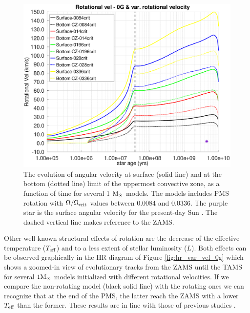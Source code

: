 \documentclass[fleqn,usenatbib]{mnras}
\begin{document}
\begin{figure}
	\includegraphics[trim = 10mm 10mm 15mm 10mm clip,width=\columnwidth]{figures/rot_vel_var_vel_0_0g.eps}
    \caption{The evolution of angular velocity at surface (solid line) and at the bottom (dotted line) limit of the uppermost convective zone, as a function of time for several 1 $\mathrm{M}_\odot$ models. The models includes PMS rotation with $\Omega / \Omega_{\mathrm{crit}}$ values between 0.0084 and 0.0336. The purple star is the surface angular velocity for the present-day Sun \citep{Gill2012}. The dashed vertical line makes reference to the ZAMS.}
    \label{fig:rot_vel_0g}
\end{figure}

Other well-known structural effects of rotation are the decrease of the effective temperature ($T_{\mathrm{eff}}$) and to a less extent of stellar luminosity ($L$). Both effects can be observed graphically in the HR diagram of Figure \ref{fig:hr_var_vel_0g} which shows a zoomed-in view of evolutionary tracks from the ZAMS until the TAMS for several $1\mathrm{M}_\odot$ models initialized with different rotational velocities. If we compare the non-rotating model (black solid line) with the rotating ones we can recognize that at the end of the PMS, the latter reach the ZAMS with a lower $T_{\mathrm{eff}}$ than the former. These results are in line with those of previous studies \citep[see e.g. ][]{Eggenberger2012,Piau2001,Pinsonneault1989}.\par
\end{document}
